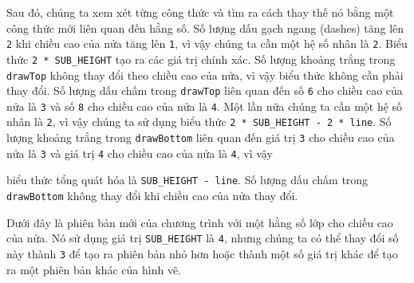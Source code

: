 Sau đó, chúng ta xem xét từng công thức và tìm ra cách thay thế nó bằng
một công thức mới liên quan đến hằng số. Số lượng dấu gạch ngang
(dashes) tăng lên \texttt{2} khi chiều cao của nửa tăng lên \texttt{1},
vì vậy chúng ta cần một hệ số nhân là \texttt{2}. Biểu thức
\texttt{2\ *\ SUB\_HEIGHT} tạo ra các giá trị chính xác. Số lượng khoảng
trắng trong \texttt{drawTop} không thay đổi theo chiều cao của nửa, vì
vậy biểu thức không cần phải thay đổi. Số lượng dấu chấm trong
\texttt{drawTop} liên quan đến số \texttt{6} cho chiều cao của nửa là
\texttt{3} và số \texttt{8} cho chiều cao của nửa là \texttt{4}. Một lần
nữa chúng ta cần một hệ số nhân là \texttt{2}, vì vậy chúng ta sử dụng
biểu thức \texttt{2\ *\ SUB\_HEIGHT\ -\ 2\ *\ line}. Số lượng khoảng
trắng trong \texttt{drawBottom} liên quan đến giá trị \texttt{3} cho
chiều cao của nửa là \texttt{3} và giá trị \texttt{4} cho chiều cao của
nửa là \texttt{4}, vì vậy

biểu thức tổng quát hóa là \texttt{SUB\_HEIGHT\ -\ line}. Số lượng dấu
chấm trong \texttt{drawBottom} không thay đổi khi chiều cao của nửa thay
đổi.

Dưới đây là phiên bản mới của chương trình với một hằng số lớp cho chiều
cao của nửa. Nó sử dụng giá trị \texttt{SUB\_HEIGHT} là \texttt{4},
nhưng chúng ta có thể thay đổi số này thành \texttt{3} để tạo ra phiên
bản nhỏ hơn hoặc thành một số giá trị khác để tạo ra một phiên bản khác
của hình vẽ.

